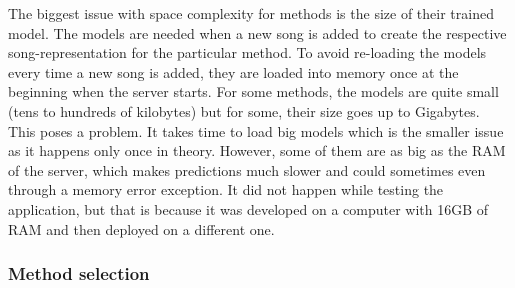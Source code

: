 The biggest issue with space complexity for methods is the size of their trained model. The models are needed when a new song is added to create the respective song-representation for the particular method. To avoid re-loading the models every time a new song is added, they are loaded into memory once at the beginning when the server starts. For some methods, the models are quite small (tens to hundreds of kilobytes) but for some, their size goes up to Gigabytes. \\
This poses a problem. It takes time to load big models which is the smaller issue as it happens only once in theory. However, some of them are as big as the RAM of the server, which makes predictions much slower and could sometimes even through a memory error exception. It did not happen while testing the application, but that is because it was developed on a computer with 16GB of RAM and then deployed on a different one.

\subsubsection{Method selection}\label{ssec:method_selection}


